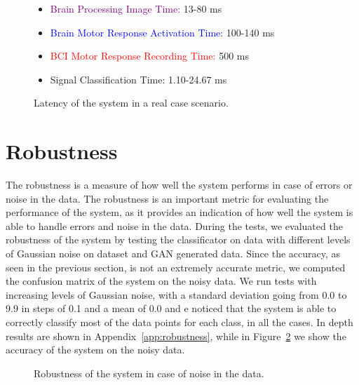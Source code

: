\begin{figure}[!htbp]
{
    }
    \begin{itemize}
        \item \textcolor{purple}{Brain Processing Image Time:} 13-80 ms
        \item \textcolor{blue}{Brain Motor Response Activation Time:} 100-140 ms
        \item \textcolor{red}{BCI Motor Response Recording Time:} 500 ms
        \item \textcolor{amethyst}{Signal Classification Time:} 1.10-24.67 ms
    \end{itemize}
    \caption{Latency of the system in a real case scenario.}\label{fig:latency}
\end{figure}

\section{Robustness}
The robustness is a measure of how well the system performs in case of errors or noise in the data.
The robustness is an important metric for evaluating the performance of the system, as it provides an indication of how well the system is able to handle errors and noise in the data.
During the tests, we evaluated the robustness of the system by testing the classificator on data with different levels of Gaussian noise on dataset and GAN generated data.
Since the accuracy, as seen in the previous section, is not an extremely accurate metric, we computed the confusion matrix of the system on the noisy data.
We run tests with increasing levels of Gaussian noise, with a standard deviation going from 0.0 to 9.9 in steps of 0.1 and a mean of 0.0 and e noticed that the system is able to correctly classify most of the data points for each class, in all the cases.
In depth results are shown in Appendix~\ref{app:robustness}, while in Figure~\ref{fig:robustness} we show the accuracy of the system on the noisy data.
\begin{figure}
    \centering
    \caption{Robustness of the system in case of noise in the data.}\label{fig:robustness}
\end{figure}

